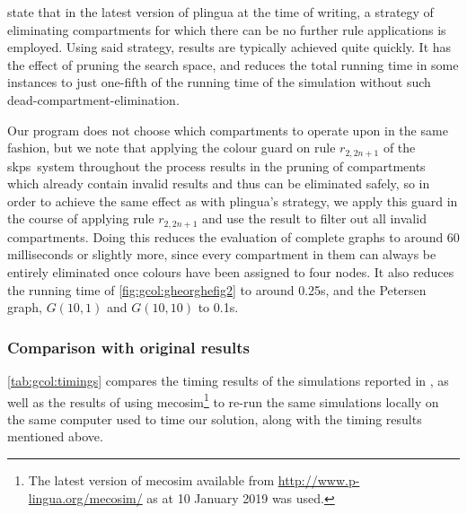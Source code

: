 \citeauthor{Gheorghe2013} state \cite[p.~828]{Gheorghe2013} that in the latest version of \gls{plingua} at the time of writing, a strategy of eliminating compartments for which there can be no further rule applications is employed.  Using said strategy, results are typically achieved quite quickly.  It has the effect of pruning the search space, and reduces the total running time in some instances to just one-fifth of the running time of the simulation without such dead-compartment-elimination.

Our program does not choose which compartments to operate upon in the same fashion, but we note that applying the colour guard on rule \(r_{2,2n+1}\) of the \gls{skps}~system throughout the process results in the pruning of compartments which already contain invalid results and thus can be eliminated safely, so in order to achieve the same effect as with \gls{plingua}'s strategy, we apply this guard in the course of applying rule \(r_{2,2n+1}\) and use the result to filter out all invalid compartments.  Doing this reduces the evaluation of complete graphs to around 60 milliseconds or slightly more, since every compartment in them can always be entirely eliminated once colours have been assigned to four nodes.  It also reduces the running time of \autoref{fig:gcol:gheorghefig2} to around 0.25s, and the Petersen graph, \(G(10,1)\) and \(G(10,10)\) to 0.1s.

\subsubsection{Comparison with original results}

\autoref{tab:gcol:timings} compares the timing results of the simulations reported in \cite{Gheorghe2013}, as well as the results of using \gls{mecosim}\footnote{The latest version of \gls{mecosim} available from \url{http://www.p-lingua.org/mecosim/} as at 10 January 2019 was used.} \cite{Perez-Hurtado2010} to re-run the same simulations locally on the same computer used to time our solution, along with the timing results mentioned above.


